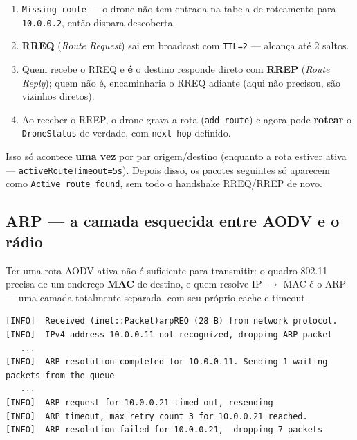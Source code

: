 \documentclass[11pt,a4paper]{article}
\begin{document}
\begin{explica}
\begin{enumerate}[leftmargin=1.3em, itemsep=2pt]
  \item \texttt{Missing route} --- o drone não tem entrada na tabela de
  roteamento para \texttt{10.0.0.2}, então dispara descoberta.
  \item \textbf{RREQ} (\emph{Route Request}) sai em broadcast com
  \texttt{TTL=2} --- alcança até 2 saltos.
  \item Quem recebe o RREQ e \textbf{é} o destino responde direto com
  \textbf{RREP} (\emph{Route Reply}); quem não é, encaminharia o RREQ adiante
  (aqui não precisou, são vizinhos diretos).
  \item Ao receber o RREP, o drone grava a rota (\texttt{add route}) e agora
  pode \textbf{rotear} o \texttt{DroneStatus} de verdade, com \texttt{next
  hop} definido.
\end{enumerate}
Isso só acontece \textbf{uma vez} por par origem/destino (enquanto a rota
estiver ativa --- \texttt{activeRouteTimeout=5s}). Depois disso, os pacotes
seguintes só aparecem como \texttt{Active route found}, sem todo o handshake
RREQ/RREP de novo.
\end{explica}

\subsection{ARP --- a camada esquecida entre AODV e o rádio}

Ter uma rota AODV ativa não é suficiente para transmitir: o quadro 802.11
precisa de um endereço \textbf{MAC} de destino, e quem resolve IP $\to$ MAC
é o ARP --- uma camada totalmente separada, com seu próprio cache e
timeout.

\begin{lstlisting}[style=simlog]
[INFO]	Received (inet::Packet)arpREQ (28 B) from network protocol.
[INFO]	IPv4 address 10.0.0.11 not recognized, dropping ARP packet
   ...
[INFO]	ARP resolution completed for 10.0.0.11. Sending 1 waiting packets from the queue
   ...
[INFO]	ARP request for 10.0.0.21 timed out, resending
[INFO]	ARP timeout, max retry count 3 for 10.0.0.21 reached.
[INFO]	ARP resolution failed for 10.0.0.21,  dropping 7 packets
\end{lstlisting}
\end{document}
